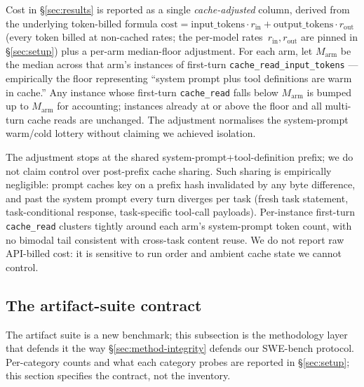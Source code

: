 Cost in §\ref{sec:results} is reported as a single
\emph{cache-adjusted} column, derived from the underlying
token-billed formula
$\text{cost} = \text{input\_tokens} \cdot r_{\text{in}}
+ \text{output\_tokens} \cdot r_{\text{out}}$
(every token billed at non-cached rates; the per-model
rates~$r_{\text{in}}, r_{\text{out}}$ are pinned in
§\ref{sec:setup}) plus a per-arm median-floor adjustment.
For each arm, let $M_{\text{arm}}$ be the median across that arm's
instances of first-turn \texttt{cache\allowbreak\_read\allowbreak\_input\allowbreak\_tokens} ---
empirically the floor representing ``system prompt plus tool
definitions are warm in cache.'' Any instance whose first-turn
\texttt{cache\_read} falls below $M_{\text{arm}}$ is bumped up to
$M_{\text{arm}}$ for accounting; instances already at or above the
floor and all multi-turn cache reads are unchanged. The adjustment
normalises the system-prompt warm/cold lottery without claiming we
achieved isolation.

The adjustment stops at the shared system-prompt+tool-definition
prefix; we do not claim control over post-prefix cache sharing. Such
sharing is empirically negligible: prompt caches key on a prefix hash
invalidated by any byte difference, and past the system prompt every
turn diverges per task (fresh task statement, task-conditional
response, task-specific tool-call payloads). Per-instance first-turn
\texttt{cache\_read} clusters tightly around each arm's system-prompt
token count, with no bimodal tail consistent with cross-task content
reuse. We do not report raw API-billed cost: it is sensitive to run
order and ambient cache state we cannot control.

\subsection{The artifact-suite contract}
\label{sec:method-artifact}
\label{sec:m-artifact}

The artifact suite is a new benchmark; this subsection is the
methodology layer that defends it the way §\ref{sec:method-integrity}
defends our SWE-bench protocol. Per-category counts and what each
category probes are reported in §\ref{sec:setup}; this section
specifies the contract, not the inventory.

